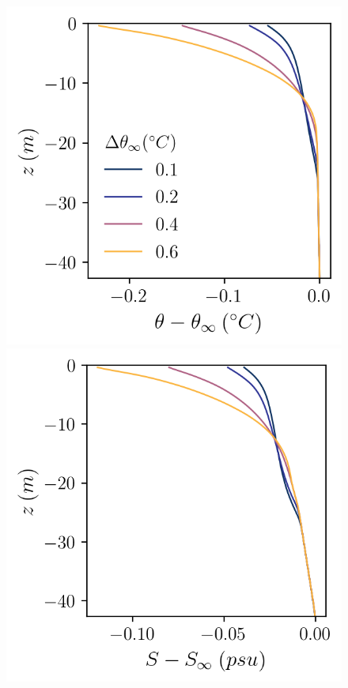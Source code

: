 \documentclass[draft]{styles/agujournal2019}
\begin{document}
\begin{figure}[h!]
    \centering
    \begin{minipage}{0.33\textwidth}
        \includegraphics[trim={0 0 0 0},clip, width=\textwidth]{Figures/pt_cmp_dT_43h_tav13h_z_profile.png}
    \end{minipage}%
    \begin{minipage}{0.33\textwidth}
        \includegraphics[trim={0 0 0 0},clip, width=\textwidth]{Figures/sa_cmp_dT_43h_tav13h_z_profile.png}

\end{minipage}
\end{figure}
\end{document}

